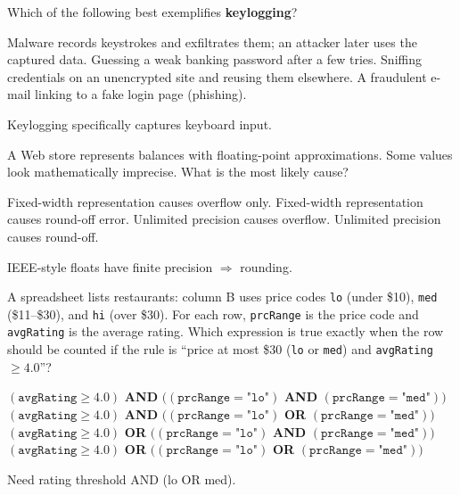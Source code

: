 \question[5]
Which of the following best exemplifies \textbf{keylogging}?
\begin{choices}
  \CorrectChoice Malware records keystrokes and exfiltrates them; an attacker later uses the captured data.
  \choice Guessing a weak banking password after a few tries.
  \choice Sniffing credentials on an unencrypted site and reusing them elsewhere.
  \choice A fraudulent e-mail linking to a fake login page (phishing).
\end{choices}
\begin{solution}
  Keylogging specifically captures keyboard input.
\end{solution}

\question[5]
A Web store represents balances with floating-point approximations. Some values look mathematically imprecise. What is the most likely cause?
\begin{choices}
  \choice Fixed-width representation causes overflow only.
  \CorrectChoice Fixed-width representation causes round-off error.
  \choice Unlimited precision causes overflow.
  \choice Unlimited precision causes round-off.
\end{choices}
\begin{solution}
  IEEE-style floats have finite precision \(\Rightarrow\) rounding.
\end{solution}




\newpage




\question[5]
A spreadsheet lists restaurants: column B uses price codes \texttt{lo} (under \$10), \texttt{med} (\$11--\$30), and \texttt{hi} (over \$30). For each row, \texttt{prcRange} is the price code and \texttt{avgRating} is the average rating. Which expression is true exactly when the row should be counted if the rule is ``price at most \$30 (\texttt{lo} or \texttt{med}) and \texttt{avgRating} $\ge 4.0$''?
\begin{choices}
  \choice $(\texttt{avgRating} \ge 4.0)$ \textbf{AND} $((\texttt{prcRange} = \texttt{"lo"})$ \textbf{AND} $(\texttt{prcRange} = \texttt{"med"}))$
  \CorrectChoice $(\texttt{avgRating} \ge 4.0)$ \textbf{AND} $((\texttt{prcRange} = \texttt{"lo"})$ \textbf{OR} $(\texttt{prcRange} = \texttt{"med"}))$
  \choice $(\texttt{avgRating} \ge 4.0)$ \textbf{OR} $((\texttt{prcRange} = \texttt{"lo"})$ \textbf{AND} $(\texttt{prcRange} = \texttt{"med"}))$
  \choice $(\texttt{avgRating} \ge 4.0)$ \textbf{OR} $((\texttt{prcRange} = \texttt{"lo"})$ \textbf{OR} $(\texttt{prcRange} = \texttt{"med"}))$
\end{choices}
\begin{solution}
  Need rating threshold AND (lo OR med).
\end{solution}

